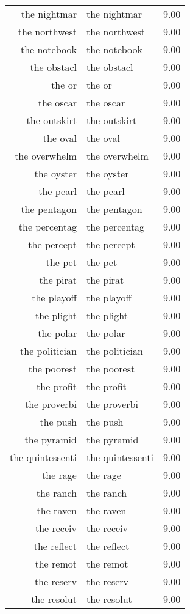 \begin{table}[ht]
\begin{tabular}{rlr}
  the nightmar & the nightmar & 9.00 \\ 
  the northwest & the northwest & 9.00 \\ 
  the notebook & the notebook & 9.00 \\ 
  the obstacl & the obstacl & 9.00 \\ 
  the or & the or & 9.00 \\ 
  the oscar & the oscar & 9.00 \\ 
  the outskirt & the outskirt & 9.00 \\ 
  the oval & the oval & 9.00 \\ 
  the overwhelm & the overwhelm & 9.00 \\ 
  the oyster & the oyster & 9.00 \\ 
  the pearl & the pearl & 9.00 \\ 
  the pentagon & the pentagon & 9.00 \\ 
  the percentag & the percentag & 9.00 \\ 
  the percept & the percept & 9.00 \\ 
  the pet & the pet & 9.00 \\ 
  the pirat & the pirat & 9.00 \\ 
  the playoff & the playoff & 9.00 \\ 
  the plight & the plight & 9.00 \\ 
  the polar & the polar & 9.00 \\ 
  the politician & the politician & 9.00 \\ 
  the poorest & the poorest & 9.00 \\ 
  the profit & the profit & 9.00 \\ 
  the proverbi & the proverbi & 9.00 \\ 
  the push & the push & 9.00 \\ 
  the pyramid & the pyramid & 9.00 \\ 
  the quintessenti & the quintessenti & 9.00 \\ 
  the rage & the rage & 9.00 \\ 
  the ranch & the ranch & 9.00 \\ 
  the raven & the raven & 9.00 \\ 
  the receiv & the receiv & 9.00 \\ 
  the reflect & the reflect & 9.00 \\ 
  the remot & the remot & 9.00 \\ 
  the reserv & the reserv & 9.00 \\ 
  the resolut & the resolut & 9.00 \\ 

\end{tabular}
\end{table}
